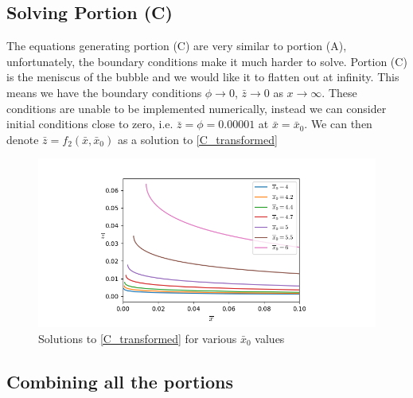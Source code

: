 \subsection{Solving Portion (C)}

The equations generating portion (C) are very similar to portion (A), unfortunately, the boundary conditions make it much harder to solve. Portion (C) is the meniscus of the bubble and we would like it to flatten out at infinity. This means we have the boundary conditions $\phi \rightarrow 0$, $\bar{z} \rightarrow 0$ as $x \rightarrow \infty$. These conditions are unable to be implemented numerically, instead we can consider initial conditions close to zero, i.e. $\bar{z}=\phi=0.00001$ at $\bar{x}=\bar{x}_0$. We can then denote $\bar{z}=f_2(\bar{x},\bar{x}_0)$ as a solution to \ref{C_transformed}

\begin{figure}
    \centering
    \includegraphics[width=0.85\linewidth]{WriteUp/images/menisc.png}
    \caption{Solutions to \ref{C_transformed} for various $\bar{x}_0$ values}
    \label{fig:7}
\end{figure}

\subsection{Combining all the portions}

